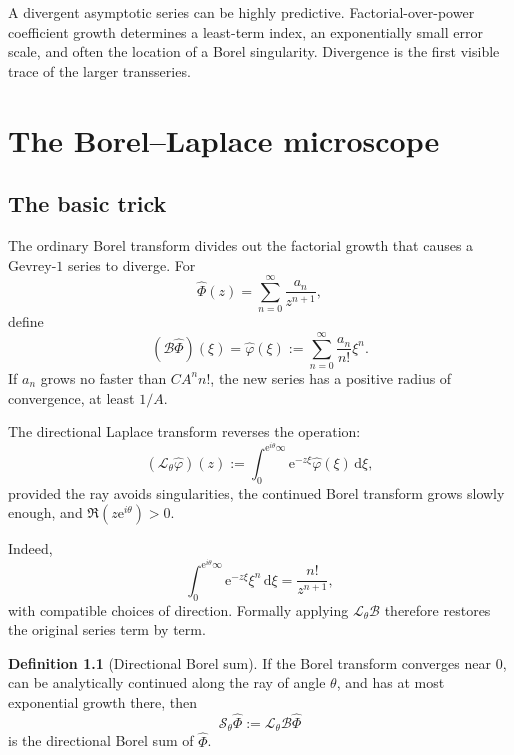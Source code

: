 \documentclass[11pt,oneside]{book}
\theoremstyle{definition}
\newtheorem{definition}[theorem]{Definition}
\theoremstyle{remark}
\newcommand{\Borel}{\mathcal{B}}
\newcommand{\Laplace}{\mathcal{L}}
\newcommand{\e}{\mathrm{e}}
\newcommand{\dd}{\,\mathrm{d}}
\newcommand{\defeq}{\mathrel{:=}}
\newcommand{\phihat}{\widehat{\Phi}}
\begin{document}
\begin{summarybox}
A divergent asymptotic series can be highly predictive. Factorial-over-power
coefficient growth determines a least-term index, an exponentially small error
scale, and often the location of a Borel singularity. Divergence is the first
visible trace of the larger transseries.
\end{summarybox}


\chapter{The Borel--Laplace microscope}
\label{ch:borel-laplace}

\section{The basic trick}

The ordinary Borel transform divides out the factorial growth that causes a
Gevrey-$1$ series to diverge. For
\[
  \phihat(z)=\sum_{n=0}^{\infty}\frac{a_n}{z^{n+1}},
\]
define
\begin{equation}
  (\Borel\phihat)(\xi)
  =\widehat\varphi(\xi)
  \defeq \sum_{n=0}^{\infty}\frac{a_n}{n!}\xi^n.
  \label{eq:borel-transform-definition}
\end{equation}
If $a_n$ grows no faster than $CA^n n!$, the new series has a positive radius
of convergence, at least $1/A$.

The directional Laplace transform reverses the operation:
\begin{equation}
  (\Laplace_\theta\widehat\varphi)(z)
  \defeq
  \int_{0}^{\e^{i\theta}\infty}
     \e^{-z\xi}\widehat\varphi(\xi)\dd\xi,
  \label{eq:directional-laplace}
\end{equation}
provided the ray avoids singularities, the continued Borel transform grows
slowly enough, and $\Re(z\e^{i\theta})>0$.

Indeed,
\begin{equation}
  \int_{0}^{\e^{i\theta}\infty}
      \e^{-z\xi}\xi^n\dd\xi
  =\frac{n!}{z^{n+1}},
  \label{eq:laplace-monomial}
\end{equation}
with compatible choices of direction. Formally applying
$\Laplace_\theta\Borel$ therefore restores the original series term by term.

\begin{definition}[Directional Borel sum]
If the Borel transform converges near $0$, can be analytically continued along
the ray of angle $\theta$, and has at most exponential growth there, then
\begin{equation}
  \mathcal S_\theta\phihat
  \defeq \Laplace_\theta\Borel\phihat
  \label{eq:directional-borel-sum}
\end{equation}
is the directional Borel sum of $\phihat$.
\end{definition}
\end{document}

